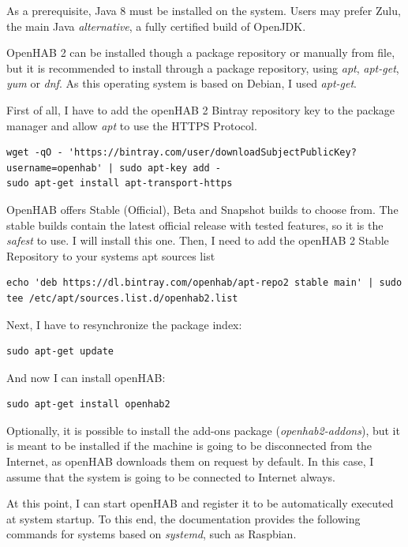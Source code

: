 As a prerequisite, Java 8 must be installed on the system. Users may prefer Zulu, the main Java \textit{alternative}, a fully
certified build of OpenJDK.\cite{zuluWebsite}

OpenHAB 2 can be installed though a package repository or manually from file, but it is recommended to install through a package
repository, using \textit{apt}, \textit{apt-get}, \textit{yum} or \textit{dnf}. As this operating system is based on Debian, I used
\textit{apt-get}.

First of all, I have to add the openHAB 2 Bintray repository key to the package manager and allow \textit{apt} to use the HTTPS
Protocol.

\begin{lstlisting}[style=Consola]
wget -qO - 'https://bintray.com/user/downloadSubjectPublicKey?username=openhab' | sudo apt-key add -
sudo apt-get install apt-transport-https
\end{lstlisting}

OpenHAB offers Stable (Official), Beta and Snapshot builds to choose from. The stable builds contain the latest official release
with tested features, so it is the \textit{safest} to use. I will install this one. Then, I need to add the openHAB 2 Stable Repository
to your systems apt sources list

\begin{lstlisting}[style=Consola]
echo 'deb https://dl.bintray.com/openhab/apt-repo2 stable main' | sudo tee /etc/apt/sources.list.d/openhab2.list
\end{lstlisting}

Next, I have to resynchronize the package index:

\begin{lstlisting}[style=Consola]
sudo apt-get update
\end{lstlisting}

And now I can install openHAB:

\begin{lstlisting}[style=Consola]
sudo apt-get install openhab2
\end{lstlisting}

Optionally, it is possible to install the add-ons package (\textit{openhab2-addons}), but it is meant to be installed if the machine
is going to be disconnected from the Internet, as openHAB downloads them on request by default. In this case, I assume that the
system is going to be connected to Internet always.

At this point, I can start openHAB and register it to be automatically executed at system startup. To this end, the documentation
provides the following commands for systems based on \textit{systemd}, such as Raspbian.

